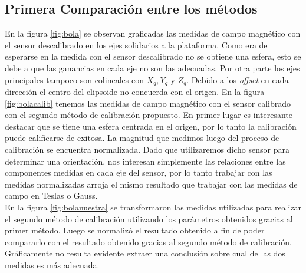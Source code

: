 \documentclass[main]{subfiles}
\begin{document}
\subsection{Primera Comparación entre los métodos}
En la figura \ref{fig:bola} se observan graficadas las medidas de campo magnético con el sensor descalibrado en los ejes solidarios a la plataforma. Como era de esperarse en la medida con el sensor descalibrado no se obtiene una esfera, esto se debe a que las ganancias en cada eje no son las adecuadas. Por otra parte los ejes principales tampoco son colineales con $X_q, Y_q $ y $ Z_q$. Debido a los \emph{offset} en cada dirección el centro del elipsoide no concuerda con el origen. En la figura \ref{fig:bolacalib} tenemos las medidas de campo magnético con el sensor calibrado con el segundo método de calibración propuesto. En primer lugar es interesante destacar que se tiene una esfera centrada en el origen, por lo tanto la calibración puede calificarse de exitosa. La magnitud que medimos luego del proceso de calibración se encuentra normalizada. Dado que utilizaremos dicho sensor para determinar una orientación, nos interesan simplemente las relaciones entre las componentes medidas en cada eje del sensor, por lo tanto trabajar con las medidas normalizadas arroja el mismo resultado que trabajar con las medidas de campo en Teslas o Gauss.\\

En la figura \ref{fig:bolanuestra} se transformaron las medidas utilizadas para realizar el segundo método de calibración utilizando los parámetros obtenidos gracias al primer método. Luego se normalizó el resultado obtenido a fin de poder compararlo con el resultado obtenido gracias al segundo método de calibración. Gráficamente no resulta evidente extraer una conclusión sobre cual de las dos medidas es más adecuada. 
\end{document}
